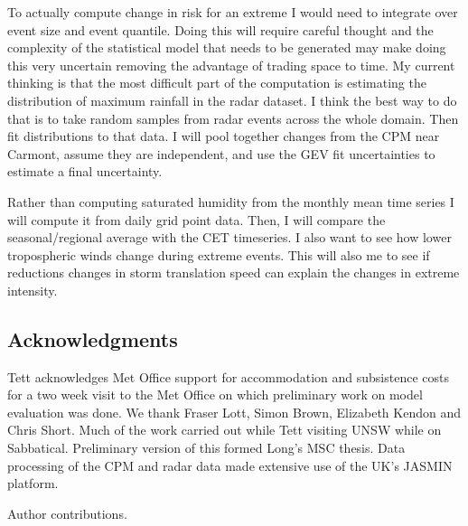 \documentclass[11pt,a4paper]{article}
\begin{document}
 
 To actually  compute change in risk for an extreme I would need to integrate over event size and event quantile. Doing this will require careful thought and the complexity of the statistical model  that needs to be generated may make doing this very uncertain removing the advantage of trading space to time.  My current thinking is that the most difficult part of the computation is estimating the distribution of maximum rainfall in the radar dataset. I think the best way to do that is to take random samples from radar events across the whole domain. Then fit distributions to that data.  I will pool together changes from the CPM near Carmont, assume they are independent, and use the GEV fit  uncertainties to estimate a final uncertainty. 

 
Rather than computing saturated humidity from the monthly mean time series I will compute it from daily grid point data. Then, I will compare the seasonal/regional average with the CET timeseries.  I also want to see how lower tropospheric  winds change during extreme events. This will also me to see if reductions changes in storm translation speed can explain the changes in extreme intensity. 

\printbibliography %

\subsection{Acknowledgments}
Tett acknowledges  Met Office support for accommodation and subsistence costs for a two week visit to the Met Office on which preliminary work on model evaluation was done. We thank Fraser Lott, Simon Brown, Elizabeth Kendon and Chris Short. Much of the  work carried out while Tett visiting UNSW while on Sabbatical. Preliminary version of this formed Long's MSC thesis.  Data processing of the CPM and radar data made extensive use of the UK's JASMIN platform. 

Author contributions. 
\pagebreak
%		

\end{document}

